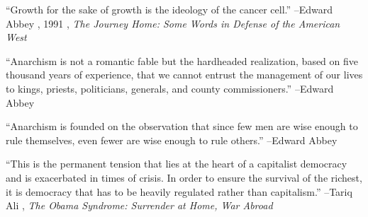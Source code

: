 \documentclass{article}%
\begin{document}
\linebreak%
\vspace{1mm}%
\begin{minipage}{\textwidth}%
\flushleft%
“Growth for the sake of growth is the ideology of the cancer cell.”%
\linebreak%
\vspace{1mm}%
–Edward Abbey%
, 1991%
, \textit{The Journey Home: Some Words in Defense of the American West}%
\linebreak%
\vspace{1mm}%
\end{minipage}%
\linebreak%
\vspace{1mm}%
\begin{minipage}{\textwidth}%
\flushleft%
“Anarchism is not a romantic fable but the hardheaded realization, based on five thousand years of experience, that we cannot entrust the management of our lives to kings, priests, politicians, generals, and county commissioners.”%
\linebreak%
\vspace{1mm}%
–Edward Abbey%
\linebreak%
\vspace{1mm}%
\end{minipage}%
\linebreak%
\vspace{1mm}%
\begin{minipage}{\textwidth}%
\flushleft%
“Anarchism is founded on the observation that since few men are wise enough to rule themselves, even fewer are wise enough to rule others.”%
\linebreak%
\vspace{1mm}%
–Edward Abbey%
\linebreak%
\vspace{1mm}%
\end{minipage}%
\linebreak%
\vspace{1mm}%
\begin{minipage}{\textwidth}%
\flushleft%
“This is the permanent tension that lies at the heart of a capitalist democracy and is exacerbated in times of crisis. In order to ensure the survival of the richest, it is democracy that has to be heavily regulated rather than capitalism.”%
\linebreak%
\vspace{1mm}%
–Tariq Ali%
, \textit{The Obama Syndrome: Surrender at Home, War Abroad}%
\linebreak%
\vspace{1mm}%
\end{minipage}%
\end{document}
